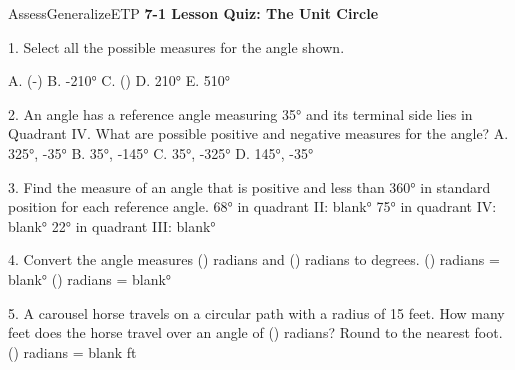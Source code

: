 \documentclass{article}
\newenvironment{te-addendum}[2]{}{}     %
\newcommand{\answer}[1]{}               %
\newcommand{\placeholder}[2]{}          %
\newcommand{\te}[1]{}                   %
\begin{document}
\begin{te-addendum}{Assess}{GeneralizeETP}
\textbf{7-1 Lesson Quiz: The Unit Circle}
\te{ASSESSMENT RESOURCES. Name blank. enVision Algebra 2. SavvasRealize.com. Assessment Sourcebook. Lesson Quiz is available at SavvasRealize.com.}
1. Select all the possible measures for the angle shown.
\placeholder{graph}{Black arrowed x,y axes centered at O without ticks. Black ray along positive x and terminal ray in II30° above negative x.30° angle label at left.}
A. (-)
B. -210°
C. ()
D. 210°
E. 510°
\answer{1. B, C, E}
2. An angle has a reference angle measuring 35° and its terminal side lies in Quadrant IV. What are possible positive and negative measures for the angle?
A. 325°, -35°
B. 35°, -145°
C. 35°, -325°
D. 145°, -35°
\answer{2. A}
3. Find the measure of an angle that is positive and less than 360° in standard position for each reference angle.
68° in quadrant II: blank°
75° in quadrant IV: blank°
22° in quadrant III: blank°
\answer{3. 112°; 285°; 202°}
4. Convert the angle measures (\frac{}) radians and () radians to degrees.
(\frac{}) radians = blank°
() radians = blank°
\answer{4. 30°; 300°}
5. A carousel horse travels on a circular path with a radius of 15 feet. How many feet does the horse travel over an angle of () radians? Round to the nearest foot.
() radians = blank ft
\answer{5. 31 ft}
\te{Printed radians=ft in answer template; quantities have different units.}
\end{te-addendum}
\end{document}
